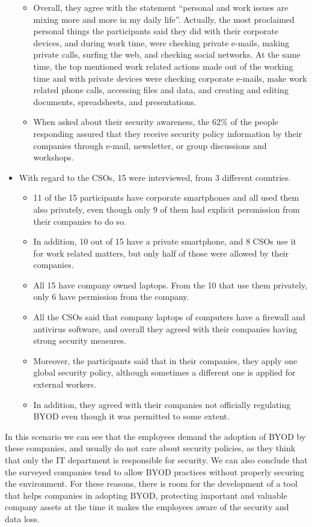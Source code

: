 \begin{itemize}
\begin{itemize}
		\item Overall, they agree with the statement ``personal and work issues are mixing more and more in my daily life''. Actually, the most proclaimed personal things the participants said they did with their corporate devices, and during work time, were checking private e-mails, making private calls, surfing the web, and checking social networks. At the same time, the top mentioned work related actions made out of the working time and with private devices were checking corporate e-mails, make work related phone calls, accessing files and data, and creating and editing documents, spreadsheets, and presentations.
		\item When asked about their security awareness, the 62\% of the people responding assured that they receive security policy information by their companies through e-mail, newsletter, or group discussions and workshops.
	\end{itemize}
	\item With regard to the CSOs, 15 were interviewed, from 3 different countries.
	\begin{itemize}
		\item 11 of the 15 participants have corporate smartphones and all used them also privately, even though only 9 of them had explicit persmission from their companies to do so.
		\item In addition, 10 out of 15 have a private smartphone, and 8 CSOs use it for work related matters, but only half of those were allowed by their companies.
		\item All 15 have company owned laptops. From the 10 that use them privately, only 6 have permission from the company.
		\item All the CSOs said that company laptops of computers have a firewall and antivirus software, and overall they agreed with their companies having strong security measures.
		\item Moreover, the participants said that in their companies, they apply one global security policy, although sometimes a different one is applied for external workers.
		\item In addition, they agreed with their companies not officially regulating BYOD even though it was permitted to some extent.
	\end{itemize}
\end{itemize}

In this scenario we can see that the employees demand the adoption of BYOD by these companies, and usually do not care about security policies, as they think that only the IT department is responsible for security. We can also conclude that the surveyed companies tend to allow BYOD practices without properly securing the environment. For these reasons, there is room for the development of a tool that helps companies in adopting BYOD, protecting important and valuable company assets at the time it makes the employees aware of the security and data loss.

